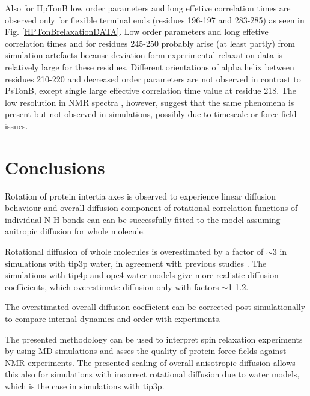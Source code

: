 \documentclass[pre,aps,floatfix,authordate1-4,twocolumn]{revtex4-1}
\begin{document}
Also for HpTonB low order parameters and long effetive correlation times
are observed only for flexible terminal ends (residues 196-197 and 283-285)
as seen in Fig. \ref{HPTonBrelaxationDATA}. Low order parameters and long
effetive correlation times and for residues 245-250 probably arise
(at least partly) from simulation artefacts because deviation form experimental
relaxation data is relatively large for these residues.
Different orientations of alpha helix between residues 210-220 and
decreased order parameters are not observed in contrast to PsTonB,
except single large effective correlation time value at residue 218.
The low resolution in NMR spectra \cite{??}, however, suggest that
the same phenomena is present but not observed in simulations, possibly
due to timescale or force field issues.

\section{Conclusions}

Rotation of protein intertia axes is observed to experience linear
diffusion behaviour and overall diffusion component of rotational 
correlation functions of individual N-H bonds can can be successfully 
fitted to the model assuming anitropic diffusion for whole molecule.

Rotational diffusion of whole molecules is overestimated by a factor
of $\sim$3 in simulations with tip3p water, in agreement with previous
studies \cite{??}. The simulations with tip4p and opc4 water models
give more realistic diffusion coefficients, which overestimate diffusion
only with factors $\sim$1-1.2. 

The overstimated overall diffusion
coefficient can be corrected post-simulationally to compare internal dynamics
and order with experiments. 

The presented methodology can be used to interpret spin relaxation experiments
by using MD simulations \cite{??} and asses the quality of protein force fields
against NMR experiments. The presented scaling of overall anisotropic diffusion
allows this also for simulations with incorrect rotational diffusion due to water
models, which is the case in simulations with tip3p. 

\begin{acknowledgments}
\end{acknowledgments}
\end{document}
